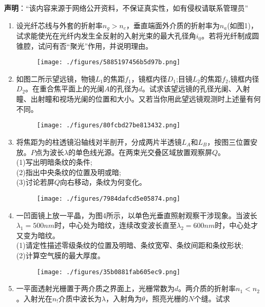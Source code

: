 
\textbf{声明}：“该内容来源于网络公开资料，不保证真实性，如有侵权请联系管理员”

\begin{enumerate}
\item 设光纤芯线与外套的折射率$n_g>n_c$，垂直端面外介质的折射率为$n_a$(如图1)，试求能使光在光纤内发生全反射的入射光束的最大孔径角$i_0$。若将光纤制成圆锥腔，试问有否“聚光”作用，并说明理由。
\begin{figure}[ht]
\centering
\texttt{[image: ./figures/5885197456b5d97b.png]}
\caption{} \label{fig_HGD00_1}
\end{figure}
\item 如图二所示望远镜，物镜$L_1$的焦距$f_1$，镜框内径$D_1$;目镜$L_2$的焦距$f_2$,镜框内径$D_2$。在重合焦平面上的光阑$A$的孔径为$d$。试求该望远镜的孔径光阑、入射瞳、出射瞳和视场光阑的位置和大小。又若当你用此望远镜观测时上述量有何不同。
\begin{figure}[ht]
\centering
\texttt{[image: ./figures/80fcbd27be813432.png]}
\caption{} \label{fig_HGD00_2}
\end{figure}
\item 将焦距为的柱透镜沿轴线对半剖开，分成两片半透镜$L_A$和$L_B$，按图三位置安放。$P$点为波长$\lambda$的单色线光源。在两束光交叠区域放置观察屏$Q$。\\
(1)写出明暗条纹的条件;\\
(2)指出中央条纹的位置及明或暗;\\
(3)讨论若屏$Q$向右移动，条纹为何变化。
\begin{figure}[ht]
\centering
\texttt{[image: ./figures/7984dafcd5e05874.png]}
\caption{} \label{fig_HGD00_3}
\end{figure}
\item 一凹面镜上放一平晶，为图4所示，以单色光垂直照射观察干涉现象。当波长$\lambda_1=500nm$时，中心处为暗纹，连续改变波长直至$\lambda_2=600nm$时，中心处才又变为暗纹。\\
(1)请定性描述零级条纹的位置及明暗、条纹宽窄、条纹间距和条纹形状;\\
(2)计算空气膜的最大厚度。
\begin{figure}[ht]
\centering
\texttt{[image: ./figures/35b0881fab605ec9.png]}
\caption{} \label{fig_HGD00_4}
\end{figure}
\item 一平面透射光栅置于两介质之界面上，光栅常数为$d$。两介质的折射率$n_1<n_2$。入射光在$n_!$介质中波长为$\lambda$，入射角为$\theta$，照亮光栅的$N$个缝。试求
\end{enumerate}